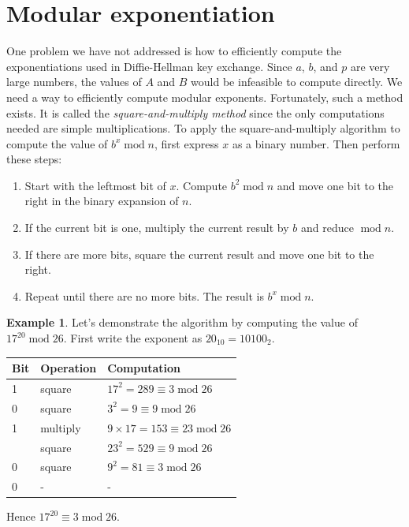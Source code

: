 \documentclass{book}
\theoremstyle{plain}
\theoremstyle{definition}
\newtheorem{example}[theorem]{Example}
\renewcommand{\mod}{\operatorname{mod}}
\renewcommand{\mod}{\operatorname{mod}}
\begin{document}
\section{Modular exponentiation}
One problem we have not addressed is how to efficiently compute the exponentiations used in Diffie-Hellman key exchange. Since $a$, $b$, and $p$ are very large numbers, the values of $A$ and $B$ would be infeasible to compute directly. We need a way to efficiently compute modular exponents. Fortunately, such a method exists. It is called the {\it square-and-multiply method} since the only computations needed are simple multiplications. To apply the square-and-multiply algorithm to compute the value of $b^x \mod n$, first express $x$ as a binary number. Then perform these steps:
\begin{enumerate}
\item Start with the leftmost bit of $x$. Compute $b^2 \mod n$ and move one bit to the right in the binary expansion of $n$.
\item If the current bit is one, multiply the current result by $b$ and reduce $\mod n$.
\item If there are more bits, square the current result and move one bit to the right.
\item Repeat until there are no more bits. The result is $b^x \mod n$.
\end{enumerate}

\begin{example}
Let's demonstrate the algorithm by computing the value of $17^{20} \mod 26$. First write the exponent as $20_{10} = 10100_2$.

\begin{center}
\begin{tabular}{lll}
Bit & Operation & Computation \\
\hline
1 & square & $17^2 = 289 \equiv 3 \mod 26$ \\
0 & square & $3^2 = 9 \equiv 9 \mod 26$ \\
1 & multiply & $9 \times 17 = 153 \equiv 23 \mod 26$ \\ 
  & square & $23^2 = 529 \equiv 9 \mod 26$ \\
0 & square & $9^2 = 81 \equiv 3 \mod 26$ \\
0 & - & -
\end{tabular}
\end{center}
Hence $17^{20} \equiv 3 \mod 26$.
\end{example}
\end{document}
